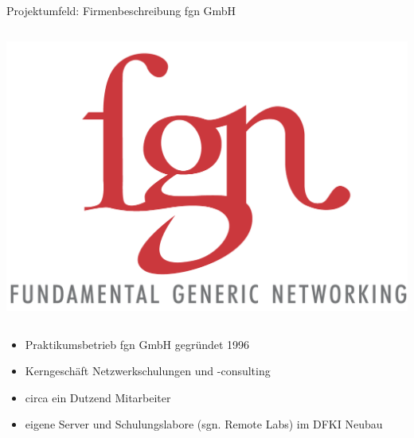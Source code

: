 \documentclass[presentation,svgnames,12pt]{beamer}
\begin{document}
\subsection{}
\begin{frame}{Projektumfeld: Firmenbeschreibung fgn GmbH}
\begin{columns}[c]
	\begin{column}{2.5cm}
		\includegraphics[scale=0.7]{Bilder/logo_fgn.png}
	\end{column}
\end{columns}
\vspace{6pt}
\begin{itemize}
	\item Praktikumsbetrieb fgn GmbH gegründet 1996
	\item Kerngeschäft Netzwerkschulungen und -consulting
	\item circa ein Dutzend Mitarbeiter
	\item eigene Server und Schulungslabore (sgn. Remote Labs) im DFKI Neubau
\end{itemize}
\end{frame}
\end{document}
